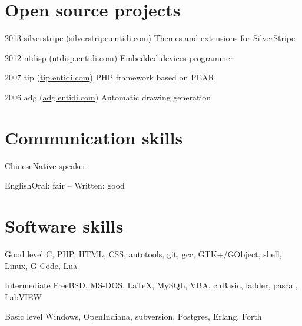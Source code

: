 \documentclass[fontsize=10pt]{tccv}
\begin{document}
\section{Open source projects}

\begin{yearlist}

\item{2013}
     {silverstripe (\href{http://silverstripe.entidi.com/}{silverstripe.entidi.com})}
     {Themes and extensions for SilverStripe}

\item{2012}
     {ntdisp (\href{http://ntdisp.entidi.com/}{ntdisp.entidi.com})}
     {Embedded devices programmer}

\item{2007}
     {tip (\href{http://tip.entidi.com/}{tip.entidi.com})}
     {PHP framework based on PEAR}

\item{2006}
     {adg (\href{http://adg.entidi.com/}{adg.entidi.com})}
     {Automatic drawing generation}

\end{yearlist}

\section{Communication skills}

\begin{factlist}
\item{Chinese}{Native speaker}
\item{English}{Oral: fair -- Written: good}
\end{factlist}

\section{Software skills}

\begin{factlist}

\item{Good level}
     {C, PHP, HTML, CSS, autotools, git, gcc, GTK+/GObject, shell,
      Linux, G-Code, Lua}

\item{Intermediate}
     {FreeBSD, MS-DOS, \LaTeX, MySQL, VBA, cuBasic, ladder, pascal,
      LabVIEW}

\item{Basic level}
     {Windows, OpenIndiana, subversion,  Postgres, Erlang, Forth}

\end{factlist}
\end{document}
